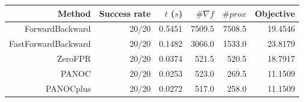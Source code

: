 \begin{tabular}{rrrrrr}
  \toprule
  \textbf{Method} & \textbf{Success rate} & \textbf{$t$ ($s$)} & \textbf{$\#\nabla f$} & \textbf{$\#prox$} & \textbf{Objective} \\
  \midrule
  ForwardBackward & 20/20 & 0.5451 & 7509.5 & 7508.5 & 19.4546 \\
  FastForwardBackward & 20/20 & 0.1482 & 3066.0 & 1533.0 & 23.8179 \\
  ZeroFPR & 20/20 & 0.0374 & 521.5 & 520.5 & 18.7917 \\
  PANOC & 20/20 & 0.0253 & 523.0 & 269.5 & 11.1509 \\
  PANOCplus & 20/20 & 0.0272 & 517.0 & 258.0 & 11.1509 \\
  \bottomrule
\end{tabular}
